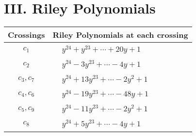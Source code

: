 \documentclass[1p]{elsarticle_modified}
\theoremstyle{definition}
\begin{document}
\centering \section*{ III. Riley Polynomials}
\begin{tabular}{m{50pt}|m{274pt}}
Crossings & \hspace{64pt}Riley Polynomials at each crossing \\
\hline $$\begin{aligned}c_{1}\end{aligned}$$&$\begin{aligned}
&y^{24}+y^{23}+\cdots+20 y+1
\end{aligned}$\\
\hline $$\begin{aligned}c_{2}\end{aligned}$$&$\begin{aligned}
&y^{24}-3 y^{23}+\cdots-4 y+1
\end{aligned}$\\
\hline $$\begin{aligned}c_{3},c_{7}\end{aligned}$$&$\begin{aligned}
&y^{24}+13 y^{23}+\cdots-2 y^2+1
\end{aligned}$\\
\hline $$\begin{aligned}c_{4},c_{6}\end{aligned}$$&$\begin{aligned}
&y^{24}-19 y^{23}+\cdots-48 y+1
\end{aligned}$\\
\hline $$\begin{aligned}c_{5},c_{9}\end{aligned}$$&$\begin{aligned}
&y^{24}-11 y^{23}+\cdots-2 y^2+1
\end{aligned}$\\
\hline $$\begin{aligned}c_{8}\end{aligned}$$&$\begin{aligned}
&y^{24}+5 y^{23}+\cdots-4 y+1
\end{aligned}$\\
\hline
\end{tabular}
\vskip 2pc
\end{document}
